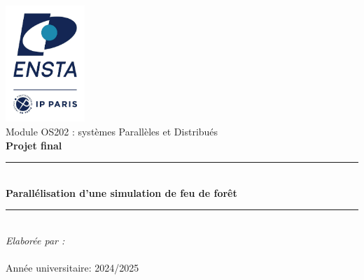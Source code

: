 
\begin{titlepage}
\BgThispage

  
\bigskip
\bigskip
\bigskip
\bigskip
\bigskip
\bigskip
\bigskip
\bigskip
\bigskip
\bigskip
\bigskip
\bigskip
\bigskip
\bigskip
\begin{center}
\includegraphics[width=3cm]{Logo_ENSTA_Paris.jpg}\\[1cm]
{ \large{Module OS202 : systèmes Parallèles et Distribués}}\\[0.5cm]
{\Large \textbf{Projet final}}\\[0.8cm]

\rule{\linewidth}{0.2mm} \\[0.7cm]
{ \huge \bfseries Parallélisation d'une simulation de feu de forêt }\\[0.2cm]
\rule{\linewidth}{0.2mm} \\[0.7cm]


\noindent
\large
\emph{ Elaborée par :}\\
   \\
\bigskip    
\bigskip
\nopagebreak
{ Année universitaire: 2024/2025}\\

\end{center}
\end{titlepage}